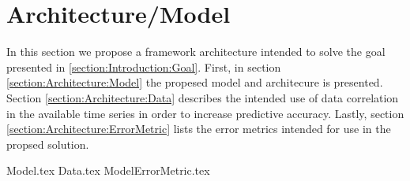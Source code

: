 \chapter{Architecture/Model}
\label{section:Architecture}

In this section we propose a framework architecture intended to solve the goal presented in \ref{section:Introduction:Goal}.
First, in section \ref{section:Architecture:Model} the propesed model and architecure is presented.
Section \ref{section:Architecture:Data} describes the intended use of data correlation in the available time series in order to increase predictive accuracy.
Lastly, section \ref{section:Architecture:ErrorMetric} lists the error metrics intended for use in the propsed solution. 

{Model.tex}
{Data.tex}
{ModelErrorMetric.tex}


\iffalse
Here you will present the architecture or model that you have chosen and that is (or will be) implemented in your work. Note that putting algorithms in your report is not desirable but in certain cases these might be placed in the appendix. Code further be avoided in the report itself but may be delivered in the fashion requested by the supervisor or, in the case of masters delivery, submitted as additional documents. 
\fi
